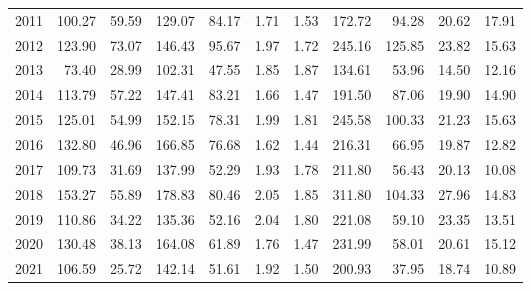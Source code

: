 \begin{tabular}{lrrrrrrrrrr}
2011 &     100.27 &  59.59 &     129.07 &   84.17 &                          1.71 &  1.53 &                                           172.72 &   94.28 &                20.62 &  17.91 \\
2012 &     123.90 &  73.07 &     146.43 &   95.67 &                          1.97 &  1.72 &                                           245.16 &  125.85 &                23.82 &  15.63 \\
2013 &      73.40 &  28.99 &     102.31 &   47.55 &                          1.85 &  1.87 &                                           134.61 &   53.96 &                14.50 &  12.16 \\
2014 &     113.79 &  57.22 &     147.41 &   83.21 &                          1.66 &  1.47 &                                           191.50 &   87.06 &                19.90 &  14.90 \\
2015 &     125.01 &  54.99 &     152.15 &   78.31 &                          1.99 &  1.81 &                                           245.58 &  100.33 &                21.23 &  15.63 \\
2016 &     132.80 &  46.96 &     166.85 &   76.68 &                          1.62 &  1.44 &                                           216.31 &   66.95 &                19.87 &  12.82 \\
2017 &     109.73 &  31.69 &     137.99 &   52.29 &                          1.93 &  1.78 &                                           211.80 &   56.43 &                20.13 &  10.08 \\
2018 &     153.27 &  55.89 &     178.83 &   80.46 &                          2.05 &  1.85 &                                           311.80 &  104.33 &                27.96 &  14.83 \\
2019 &     110.86 &  34.22 &     135.36 &   52.16 &                          2.04 &  1.80 &                                           221.08 &   59.10 &                23.35 &  13.51 \\
2020 &     130.48 &  38.13 &     164.08 &   61.89 &                          1.76 &  1.47 &                                           231.99 &   58.01 &                20.61 &  15.12 \\
2021 &     106.59 &  25.72 &     142.14 &   51.61 &                          1.92 &  1.50 &                                           200.93 &   37.95 &                18.74 &  10.89 \\
\bottomrule
\end{tabular}

